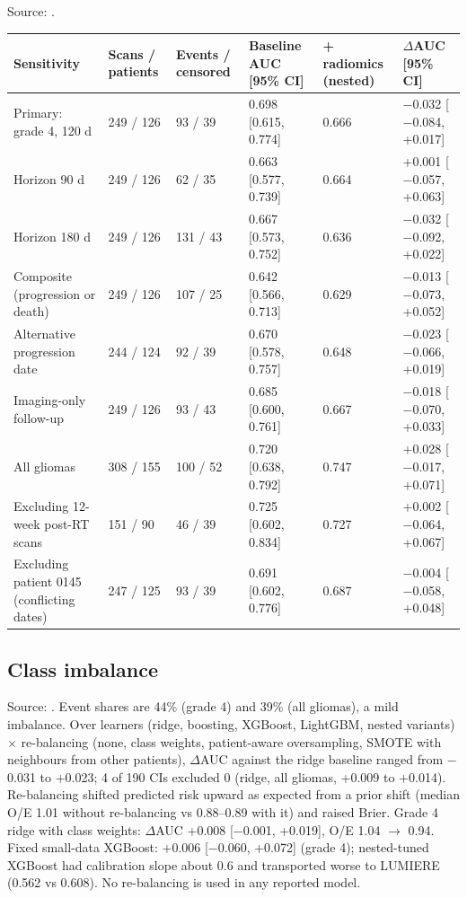 \documentclass[11pt,a4paper]{article}
\begin{document}
Source: .

\begin{table}[H]
\centering
\footnotesize
\begin{tabularx}{\linewidth}{@{}L R{1.5cm} R{1.5cm} R{2.9cm} R{1.4cm} R{3.5cm}@{}}
\toprule
Sensitivity & Scans / patients & Events / censored & Baseline AUC [95\% CI] & + radiomics (nested) & $\Delta$AUC [95\% CI] \\
\midrule
Primary: grade 4, 120 d & 249 / 126 & 93 / 39 & 0.698 [0.615, 0.774] & 0.666 & $-$0.032 [$-$0.084, +0.017] \\
Horizon 90 d & 249 / 126 & 62 / 35 & 0.663 [0.577, 0.739] & 0.664 & +0.001 [$-$0.057, +0.063] \\
Horizon 180 d & 249 / 126 & 131 / 43 & 0.667 [0.573, 0.752] & 0.636 & $-$0.032 [$-$0.092, +0.022] \\
Composite (progression or death) & 249 / 126 & 107 / 25 & 0.642 [0.566, 0.713] & 0.629 & $-$0.013 [$-$0.073, +0.052] \\
Alternative progression date & 244 / 124 & 92 / 39 & 0.670 [0.578, 0.757] & 0.648 & $-$0.023 [$-$0.066, +0.019] \\
Imaging-only follow-up & 249 / 126 & 93 / 43 & 0.685 [0.600, 0.761] & 0.667 & $-$0.018 [$-$0.070, +0.033] \\
All gliomas & 308 / 155 & 100 / 52 & 0.720 [0.638, 0.792] & 0.747 & +0.028 [$-$0.017, +0.071] \\
Excluding 12-week post-RT scans & 151 / 90 & 46 / 39 & 0.725 [0.602, 0.834] & 0.727 & +0.002 [$-$0.064, +0.067] \\
Excluding patient 0145 (conflicting dates) & 247 / 125 & 93 / 39 & 0.691 [0.602, 0.776] & 0.687 & $-$0.004 [$-$0.058, +0.048] \\
\bottomrule
\end{tabularx}
\end{table}

\subsection{Class imbalance}\label{sec:S12.3}

Source: . Event shares are 44\% (grade 4) and 39\% (all
gliomas), a mild
imbalance. Over learners (ridge, boosting, XGBoost, LightGBM, nested variants) $\times$ re-balancing (none,
class weights, patient-aware oversampling, SMOTE with neighbours from other patients), $\Delta$AUC against the
ridge baseline ranged from $-$0.031 to +0.023; 4 of 190 CIs excluded 0 (ridge, all gliomas, +0.009 to +0.014).
Re-balancing shifted predicted risk upward as expected from a prior shift (median O/E 1.01 without
re-balancing vs 0.88--0.89 with it) and raised Brier. Grade 4 ridge with class weights: $\Delta$AUC +0.008
[$-$0.001, +0.019], O/E 1.04 $\rightarrow$ 0.94. Fixed small-data XGBoost: +0.006 [$-$0.060, +0.072] (grade
4); nested-tuned XGBoost had calibration slope about 0.6 and transported worse to LUMIERE (0.562 vs 0.608). No
re-balancing is used in any reported model.
\end{document}
